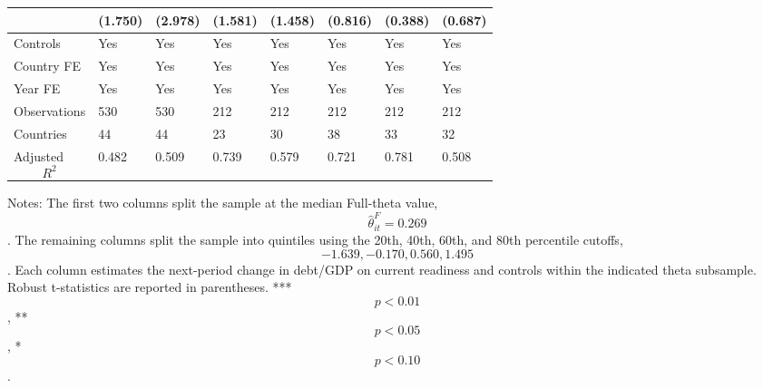 \begin{table}[H]
\begin{threeparttable}
\begin{tabularx}{\textwidth}{lYYYYYYY}
  & (1.750) & (2.978) & (1.581) & (1.458) & (0.816) & (0.388) & (0.687) \\
\midrule
Controls & Yes & Yes & Yes & Yes & Yes & Yes & Yes \\
Country FE & Yes & Yes & Yes & Yes & Yes & Yes & Yes \\
Year FE & Yes & Yes & Yes & Yes & Yes & Yes & Yes \\
Observations & 530 & 530 & 212 & 212 & 212 & 212 & 212 \\
Countries & 44 & 44 & 23 & 30 & 38 & 33 & 32 \\
Adjusted $$R^2$$ & 0.482 & 0.509 & 0.739 & 0.579 & 0.721 & 0.781 & 0.508 \\
\bottomrule
\end{tabularx}
\begin{tablenotes}[flushleft]\footnotesize
\item Notes: The first two columns split the sample at the median Full-theta value, $$\widehat{\theta}^{F}_{it}=0.269$$. The remaining columns split the sample into quintiles using the 20th, 40th, 60th, and 80th percentile cutoffs, $$-1.639, -0.170, 0.560, 1.495$$. Each column estimates the next-period change in debt/GDP on current readiness and controls within the indicated theta subsample. Robust t-statistics are reported in parentheses. *** $$p<0.01$$, ** $$p<0.05$$, * $$p<0.10$$.
\end{tablenotes}
\end{threeparttable}
\end{table}
